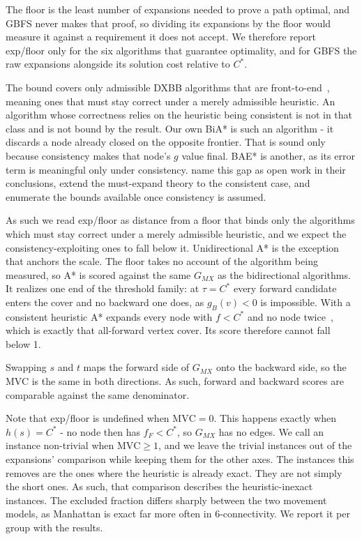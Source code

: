 \documentclass[letterpaper]{article} %
\begin{document}
The floor is the least number of expansions needed to prove a path optimal, and GBFS never makes that proof, so dividing its expansions by the floor would measure it against a requirement it does not accept. We therefore report exp/floor only for the six algorithms that guarantee optimality, and for GBFS the raw expansions alongside its solution cost relative to $C^*$.

The bound covers only admissible DXBB algorithms that are front-to-end~\cite{eckerle2017sufficient}, meaning ones that must stay correct under a merely admissible heuristic. An algorithm whose correctness relies on the heuristic being consistent is not in that class and is not bound by the result. Our own BiA* is such an algorithm - it discards a node already closed on the opposite frontier. That is sound only because consistency makes that node's $g$ value final. BAE* is another, as its error term is meaningful only under consistency. \citet{eckerle2017sufficient} name this gap as open work in their conclusions, \citet{alcazar2021consistent} extend the must-expand theory to the consistent case, and \citet{siag2023frontToEnd} enumerate the bounds available once consistency is assumed.

As such we read exp/floor as distance from a floor that binds only the algorithms which must stay correct under a merely admissible heuristic, and we expect the consistency-exploiting ones to fall below it. Unidirectional A* is the exception that anchors the scale. The floor takes no account of the algorithm being measured, so A* is scored against the same $G_{MX}$ as the bidirectional algorithms. It realizes one end of the threshold family: at $\tau = C^*$ every forward candidate enters the cover and no backward one does, as $g_B(v) < 0$ is impossible. With a consistent heuristic A* expands every node with $f<C^*$ and no node twice~\cite{dechter1985generalized}, which is exactly that all-forward vertex cover. Its score therefore cannot fall below 1.

Swapping $s$ and $t$ maps the forward side of $G_{MX}$ onto the backward side, so the MVC is the same in both directions. As such, forward and backward scores are comparable against the same denominator.

Note that exp/floor is undefined when $\text{MVC}=0$. This happens exactly when $h(s)=C^*$ - no node then has $f_F<C^*$, so $G_{MX}$ has no edges. We call an instance non-trivial when $\text{MVC}\ge1$, and we leave the trivial instances out of the expansions' comparison while keeping them for the other axes. The instances this removes are the ones where the heuristic is already exact. They are not simply the short ones. As such, that comparison describes the heuristic-inexact instances. The excluded fraction differs sharply between the two movement models, as Manhattan is exact far more often in 6-connectivity. We report it per group with the results.
\end{document}
